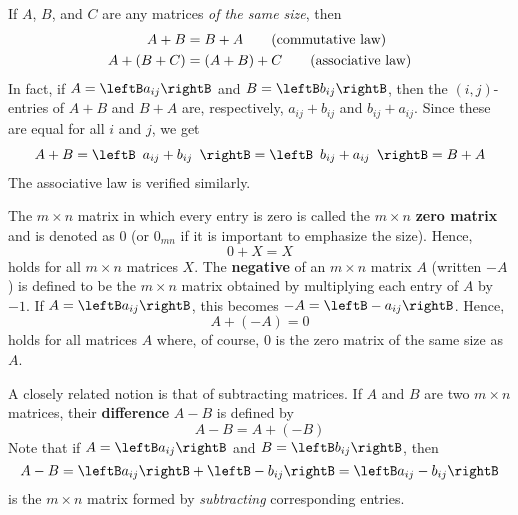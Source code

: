 If $A$, $B$, and $C$ are any matrices \textit{of the same size}, then
\begin{align}
A + B &= B + A \tag{commutative law}\index{commutative law} \\
A + (B + C) &= (A + B) + C \tag{associative law}\index{associative law}
\end{align}
In fact, if $A = \leftB a_{ij} \rightB$ and $B = \leftB b_{ij} \rightB$, then the $(i, j)$-entries of $A + B$ and $B + A$ are, respectively, $a_{ij} + b_{ij}$ and $b_{ij} + a_{ij}$. Since these are equal for all $i$ and $j$, we get
\begin{equation*}
A + B = \leftB \begin{array}{c}
a_{ij} + b_{ij}
\end{array} \rightB
=
\leftB \begin{array}{c}
b_{ij} + a_{ij}
\end{array} \rightB
= B + A
\end{equation*}
The associative law is verified similarly.

The $m \times n$ matrix in which every entry is zero is called the $m \times n$ \textbf{zero matrix} and is denoted as $0$ (or $0_{mn}$ if it is important to emphasize the size). Hence,
\begin{equation*}
0 + X = X
\end{equation*}
holds for all $m \times n$ matrices $X$. The \textbf{negative} of an $m \times n$ matrix $A$ (written $-A$) is defined to be the $m \times n$ matrix obtained by multiplying each entry of $A$ by $-1$. If $A = \leftB a_{ij} \rightB$, this becomes $-A = \leftB -a_{ij} \rightB$. Hence,
\begin{equation*}
A + (-A) = 0
\end{equation*}
holds for all matrices $A$ where, of course, $0$ is the zero matrix of the same size as $A$.


A closely related notion is that of subtracting matrices. If $A$ and $B$ are two $m \times n$ matrices, their \textbf{difference} $A - B$ is defined by
\begin{equation*}
A - B = A + (-B)
\end{equation*}
Note that if $A = \leftB a_{ij} \rightB$ and $B = \leftB b_{ij} \rightB$, then
\begin{equation*}
A - B = \leftB a_{ij} \rightB  + \leftB -b_{ij} \rightB = \leftB a_{ij} - b_{ij} \rightB
\end{equation*}
is the $m \times n$ matrix formed by \textit{subtracting} corresponding entries.

